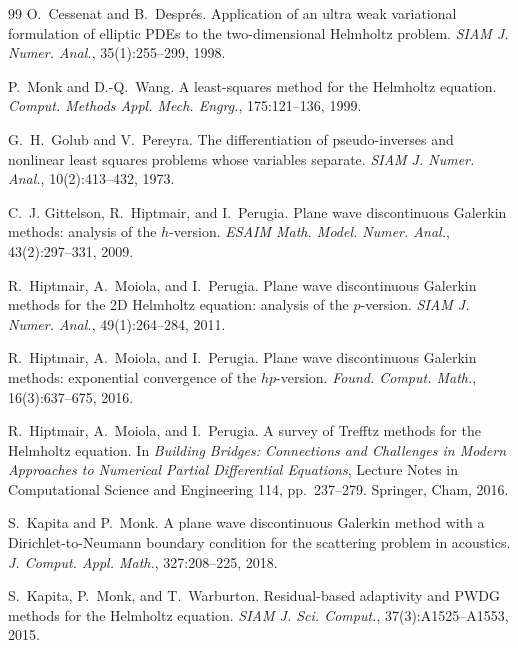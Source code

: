 \documentclass[pdflatex,sn-mathphys-num]{sn-jnl}
\theoremstyle{thmstyleone}
\theoremstyle{thmstyletwo}
\begin{document}
\begin{thebibliography}{99}
O.~Cessenat and B.~Despr\'es.
\newblock Application of an ultra weak variational formulation of elliptic PDEs to the two-dimensional Helmholtz problem.
\newblock \emph{SIAM J. Numer. Anal.}, 35(1):255--299, 1998.

P.~Monk and D.-Q.~Wang.
\newblock A least-squares method for the Helmholtz equation.
\newblock \emph{Comput. Methods Appl. Mech. Engrg.}, 175:121--136, 1999.

G.~H.~Golub and V.~Pereyra.
\newblock The differentiation of pseudo-inverses and nonlinear least squares problems whose variables separate.
\newblock \emph{SIAM J. Numer. Anal.}, 10(2):413--432, 1973.

C.~J. Gittelson, R.~Hiptmair, and I.~Perugia.
\newblock Plane wave discontinuous Galerkin methods: analysis of the $h$-version.
\newblock \emph{ESAIM Math. Model. Numer. Anal.}, 43(2):297--331, 2009.

R.~Hiptmair, A.~Moiola, and I.~Perugia.
\newblock Plane wave discontinuous Galerkin methods for the 2D Helmholtz equation: analysis of the $p$-version.
\newblock \emph{SIAM J. Numer. Anal.}, 49(1):264--284, 2011.

R.~Hiptmair, A.~Moiola, and I.~Perugia.
\newblock Plane wave discontinuous Galerkin methods: exponential convergence of the $hp$-version.
\newblock \emph{Found. Comput. Math.}, 16(3):637--675, 2016.

R.~Hiptmair, A.~Moiola, and I.~Perugia.
\newblock A survey of Trefftz methods for the Helmholtz equation.
\newblock In \emph{Building Bridges: Connections and Challenges in Modern Approaches to Numerical Partial Differential Equations}, Lecture Notes in Computational Science and Engineering 114, pp.~237--279. Springer, Cham, 2016.

S.~Kapita and P.~Monk.
\newblock A plane wave discontinuous Galerkin method with a Dirichlet-to-Neumann boundary condition for the scattering problem in acoustics.
\newblock \emph{J. Comput. Appl. Math.}, 327:208--225, 2018.

S.~Kapita, P.~Monk, and T.~Warburton.
\newblock Residual-based adaptivity and PWDG methods for the Helmholtz equation.
\newblock \emph{SIAM J. Sci. Comput.}, 37(3):A1525--A1553, 2015.


\end{thebibliography}
\end{document}

